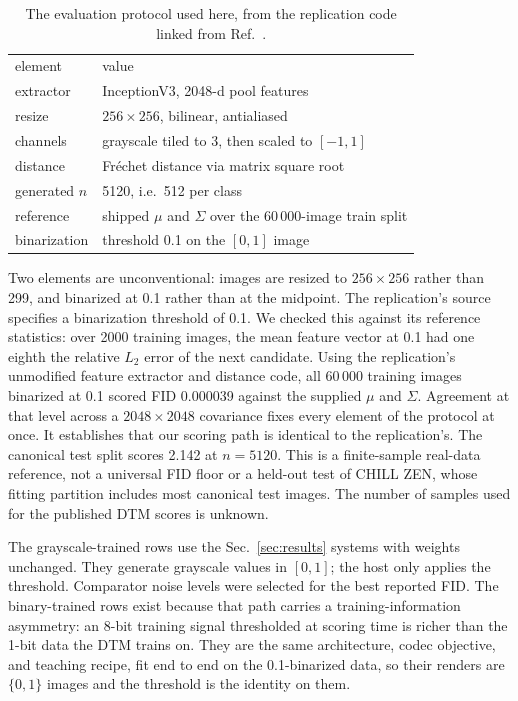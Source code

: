 \documentclass[reprint,amsmath,amssymb,aps,nofootinbib]{revtex4-2}
\begin{document}
\begin{table}
\caption{The evaluation protocol used here, from the replication code \cite{dtmreplication} linked from
Ref.~\cite{extropic2025thrml}.
\label{tab:protocol}}
\begin{ruledtabular}
\begin{tabular}{lp{4.5cm}}
element & value \\
\colrule
extractor & InceptionV3, 2048-d pool features \\
resize & $256\times256$, bilinear, antialiased \\
channels & grayscale tiled to 3, then scaled to $[-1,1]$ \\
distance & Fr\'echet distance via matrix square root \\
generated $n$ & 5120, i.e.\ 512 per class \\
reference & shipped $\mu$ and $\Sigma$ over the 60\,000-image train
split \\
binarization & threshold 0.1 on the $[0,1]$ image \\
\end{tabular}
\end{ruledtabular}
\end{table}

Two elements are unconventional: images are resized to $256\times256$
rather than 299, and binarized at 0.1 rather than at the midpoint. The replication's source specifies a binarization threshold of 0.1. We
checked this against its reference statistics: over 2000 training
images, the mean feature vector at 0.1 had one eighth the relative $L_2$
error of the next candidate. Using the replication's unmodified feature
extractor and distance code, all 60\,000 training images binarized at
0.1 scored FID 0.000039 against the supplied $\mu$ and $\Sigma$. Agreement at that level across a $2048\times2048$ covariance
fixes every element of the protocol at once. It establishes that our
scoring path is identical to the replication's. The canonical test split scores
2.142 at $n=5120$. This is a finite-sample real-data reference, not a
universal FID floor or a held-out test of CHILL ZEN, whose fitting
partition includes most canonical test images. The number of samples used for the published DTM scores is unknown.

The grayscale-trained rows use the Sec.~\ref{sec:results} systems with
weights unchanged. They generate grayscale values in $[0,1]$; the host
only applies the threshold. Comparator noise levels were selected for
the best reported FID. The
binary-trained rows exist because that path carries a
training-information asymmetry: an 8-bit training signal thresholded
at scoring time is richer than the 1-bit data the DTM trains on. They
are the same architecture, codec objective, and teaching recipe, fit
end to end on the 0.1-binarized data, so their renders are
$\{0, 1\}$ images and the threshold is the identity on them.
\end{document}
